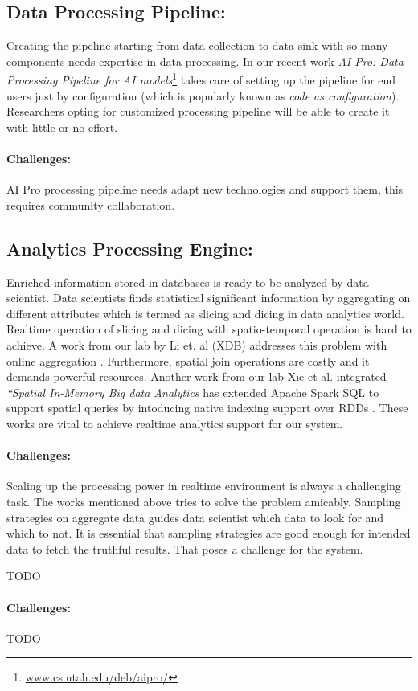 \subsection{Data Processing Pipeline:}
Creating the pipeline starting from data collection to data sink with so many components needs expertise in data processing. In our recent work {\em AI Pro: Data Processing Pipeline for AI models}\footnote{\href{http://www.cs.utah.edu/~deb/aipro/}{www.cs.utah.edu/deb/aipro/}} takes care of setting up the pipeline for end users just by configuration (which is popularly known as {\em code as configuration}).
Researchers opting for customized processing pipeline will be able to create it with little or no effort.

\vspace{-2mm}
\paragraph{Challenges:}
AI Pro processing pipeline needs adapt new technologies and support them, this requires community collaboration.

\subsection{Analytics Processing Engine:}
Enriched information stored in databases is ready to be analyzed by data scientist. Data scientists finds  statistical significant information by aggregating on different attributes which is termed as slicing and dicing in data analytics world. Realtime operation of slicing and dicing with spatio-temporal operation is hard to achieve. A work from our lab by Li et. al (XDB) addresses this problem with online aggregation \cite{li2017wander}. Furthermore, spatial join operations are costly and it demands powerful resources. Another work from our lab Xie et al. integrated {\em ``Spatial In-Memory Big data Analytics}  \cite{xie2016simba} has extended Apache Spark SQL to support spatial queries by intoducing native indexing support over RDDs \cite{sparkcitation}. These works are vital to achieve realtime analytics support for our system.


\vspace{-2mm}
\paragraph{Challenges:}
Scaling up the processing power in realtime environment is always a challenging task. The works mentioned above tries to solve the problem amicably. Sampling strategies on aggregate data guides data scientist which data to look for and which to not. It is essential that sampling strategies are good enough for intended data to fetch the truthful results. That poses a challenge for the system.

TODO

\vspace{-2mm}
\paragraph{Challenges:}
TODO

